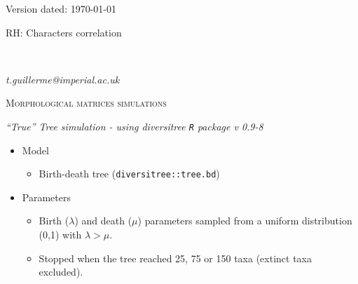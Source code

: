 \documentclass[12pt,letterpaper]{article}
\renewcommand{\section}[1]{%
\bigskip
\begin{center}
\begin{Large}
\normalfont\scshape #1
\medskip
\end{Large}
\end{center}}
\renewcommand{\subsection}[1]{%
\bigskip
\begin{center}
\begin{large}
\normalfont\itshape #1
\end{large}
\end{center}}
\begin{document}
\begin{flushright}
Version dated: \today
\end{flushright}
\bigskip
\noindent RH: Characters correlation

\bigskip
\medskip
\begin{center}

\bigskip
{}

\\
\end{center}
\medskip
{} \textit{t.guillerme@imperial.ac.uk}\\ 


\section{Morphological matrices simulations}

\subsection{``True'' Tree simulation - using diversitree \texttt{R} package v 0.9-8 \cite{fitzjohndiversitree2012}}
\begin{itemize}
  \item Model
  \begin{itemize}
    \item Birth-death tree (\texttt{diversitree::tree.bd})
  \end{itemize}
  \item Parameters
  \begin{itemize}
    \item Birth ($\lambda$) and death ($\mu$) parameters sampled from a uniform distribution (0,1) with $\lambda > \mu$.
    \item Stopped when the tree reached 25, 75 or 150 taxa (extinct taxa excluded).
  \end{itemize}
\end{itemize}
\end{document}
